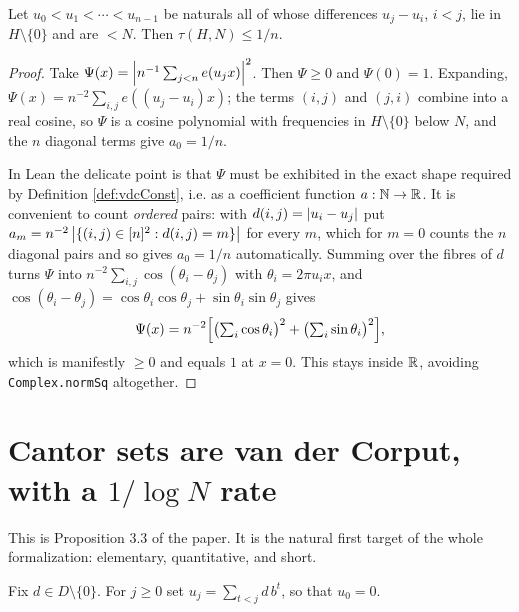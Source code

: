 \begin{lemma}
  \label{lem:fejer}
  \leanok
  Let $u_0 < u_1 < \cdots < u_{n-1}$ be naturals all of whose differences
  $u_j - u_i$, $i < j$, lie in $H \setminus \{0\}$ and are $< N$. Then
  $\tau(H, N) \leq 1/n$.
\end{lemma}
\begin{proof}
  \leanok
  Take $\Psi(x) = \left\lvert n^{-1}\sum_{j<n} e(u_j x) \right\rvert^2$. Then $\Psi \geq 0$ and
  $\Psi(0) = 1$. Expanding, $\Psi(x) = n^{-2}\sum_{i,j} e((u_j - u_i)x)$; the
  terms $(i,j)$ and $(j,i)$ combine into a real cosine, so $\Psi$ is a cosine
  polynomial with frequencies in $H \setminus \{0\}$ below $N$, and the $n$
  diagonal terms give $a_0 = 1/n$.

  In Lean the delicate point is that $\Psi$ must be exhibited in the exact
  shape required by Definition \ref{def:vdcConst}, i.e. as a coefficient
  function $a : \mathbb{N} \to \mathbb{R}$. It is convenient to count \emph{ordered} pairs:
  with $d(i,j) = \left\lvert u_i - u_j \right\rvert$ put
  $a_m = n^{-2}\left\lvert \{(i,j) \in [n]^2 : d(i,j) = m\} \right\rvert$ for every $m$, which
  for $m = 0$ counts the $n$ diagonal pairs and so gives $a_0 = 1/n$
  automatically. Summing over the fibres of $d$ turns $\Psi$ into
  $n^{-2}\sum_{i,j} \cos(\theta_i - \theta_j)$
  with $\theta_i = 2\pi u_i x$, and $\cos(\theta_i - \theta_j) =
  \cos\theta_i\cos\theta_j + \sin\theta_i\sin\theta_j$ gives
  \[
    \Psi(x) = n^{-2}\Bigl[\bigl(\textstyle\sum_i \cos\theta_i\bigr)^2
      + \bigl(\textstyle\sum_i \sin\theta_i\bigr)^2\Bigr] ,
  \]
  which is manifestly $\geq 0$ and equals $1$ at $x = 0$. This stays inside
  $\mathbb{R}$, avoiding \texttt{Complex.normSq} altogether.
\end{proof}

\section{Cantor sets are van der Corput, with a $1/\log N$ rate}

This is Proposition 3.3 of the paper. It is the natural first target of the
whole formalization: elementary, quantitative, and short.

\begin{definition}
  \label{def:tower}
  \leanok
  Fix $d \in D \setminus \{0\}$. For $j \geq 0$ set
  $u_j = \sum_{t < j} d\, b^t$, so that $u_0 = 0$.
\end{definition}

